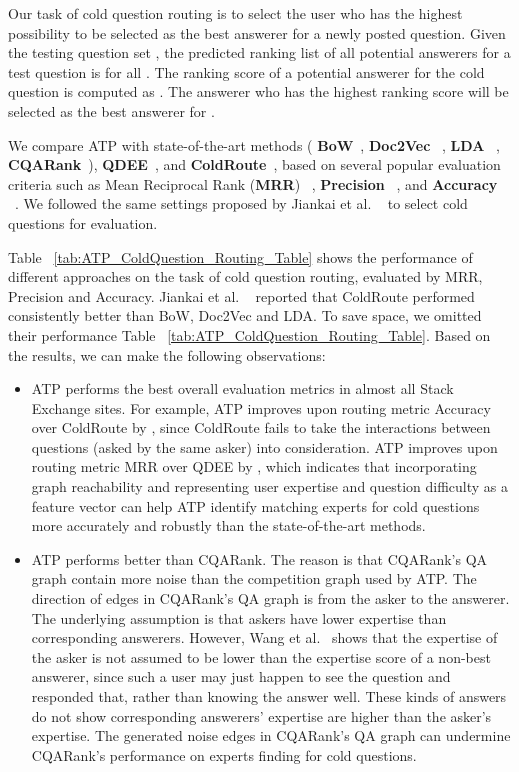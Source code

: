 \documentclass[letterpaper]{article} \usepackage{aaai19}  \usepackage{times}  \usepackage{helvet}  \usepackage{courier}  \usepackage{url}  \usepackage{graphicx}  \usepackage{booktabs} \usepackage{xcolor}
\begin{document}
Our task of cold question routing is to select the user who has the highest possibility to be selected as the best answerer for a newly posted question. Given the testing question set , the predicted ranking list of all potential answerers for a test question  is  for all . The ranking score of a potential answerer  for the cold question  is computed as . The answerer who has the highest ranking score will be selected as the best answerer for . 

We compare ATP with state-of-the-art methods ( {\bf BoW}~\cite{Figueroa2013LRE-BOW}, {\bf Doc2Vec} ~\cite{CQAWord2Vec}, 
{\bf LDA} ~\cite{Ji2012LDA}, {\bf CQARank}~\cite{Yang2013CQArank}), {\bf QDEE}~\cite{QDEE2018}, and {\bf ColdRoute}~\cite{ColdRoute}, based on several popular evaluation criteria such as Mean Reciprocal Rank ({\bf MRR}) ~\cite{Zhu2014}, {\bf Precision} ~\cite{zhao2017community,ColdRoute}, and {\bf Accuracy} ~\cite{zhao2017community,ColdRoute}. We followed the same settings proposed by Jiankai et al. ~\cite{ColdRoute} to select cold questions for evaluation. 

Table ~\ref{tab:ATP_ColdQuestion_Routing_Table} shows the performance of different approaches on the task of cold question routing, evaluated by MRR,  Precision and Accuracy. Jiankai et al. ~\cite{ColdRoute} reported that ColdRoute performed consistently better than BoW, Doc2Vec and LDA. To save space, we omitted their performance Table ~\ref{tab:ATP_ColdQuestion_Routing_Table}. 
Based on the results, we can make the following observations:

\begin{itemize}[leftmargin=0.4cm]
    \item ATP performs the best overall evaluation metrics in almost all Stack Exchange sites. For example, ATP improves upon routing metric Accuracy over ColdRoute by , since ColdRoute fails to take the interactions between questions (asked by the same asker) into consideration.
    ATP improves upon routing metric MRR over QDEE by , which indicates that incorporating graph reachability and representing user expertise and question difficulty as a feature vector can help ATP identify matching experts for cold questions more accurately and robustly than the state-of-the-art methods. 
    \item ATP performs better than CQARank. The reason is that CQARank's QA graph contain more noise than the competition graph used by ATP. The direction of edges in CQARank's QA graph is from the asker to the answerer. The underlying assumption is that askers have lower expertise than corresponding answerers. However, Wang et al.~\cite{wang2014} shows that the expertise of the asker is not assumed to be lower than the expertise score of a non-best answerer, since such a user may just happen to see the question and responded that, rather than knowing the answer well. These kinds of answers do not show corresponding answerers' expertise are higher than the asker's expertise. The generated noise edges in CQARank's QA graph can undermine CQARank's performance on experts finding for cold questions.
\end{itemize}
\end{document}
